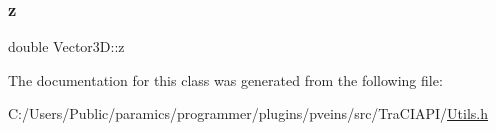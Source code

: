 \subsubsection{\texorpdfstring{z}{z}}
{\footnotesize\ttfamily double Vector3\+D\+::z}



The documentation for this class was generated from the following file\+:\begin{DoxyCompactItemize}
\item 
C\+:/\+Users/\+Public/paramics/programmer/plugins/pveins/src/\+Tra\+C\+I\+A\+P\+I/\hyperlink{_utils_8h}{Utils.\+h}\end{DoxyCompactItemize}
